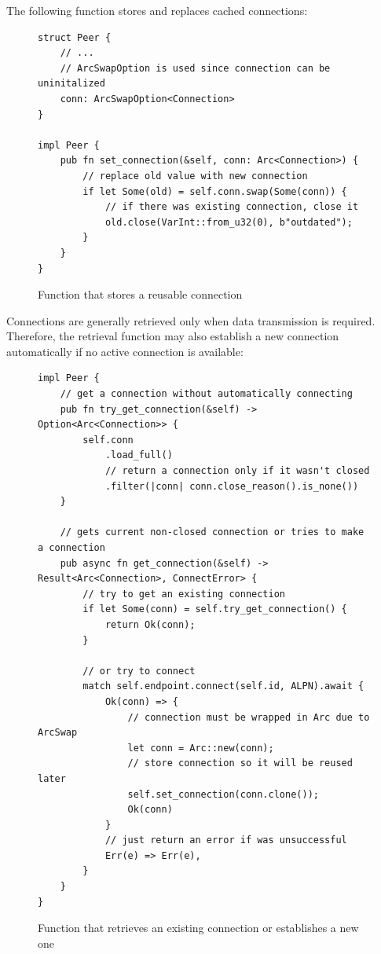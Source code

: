 \documentclass[a4paper, 10pt]{article}
\begin{document}
\newpage

The following function stores and replaces cached connections:
\begin{figure}[H]
  \begin{verbatim}
struct Peer {
    // ...
    // ArcSwapOption is used since connection can be uninitalized
    conn: ArcSwapOption<Connection>
}

impl Peer {
    pub fn set_connection(&self, conn: Arc<Connection>) {
        // replace old value with new connection
        if let Some(old) = self.conn.swap(Some(conn)) {
            // if there was existing connection, close it
            old.close(VarInt::from_u32(0), b"outdated");
        }
    }
}
  \end{verbatim}
  \caption{Function that stores a reusable connection}
\end{figure}

Connections are generally retrieved only when data transmission is required.
Therefore, the retrieval function may also establish a new connection automatically if no active connection is available:
\begin{figure}[H]
  \begin{verbatim}
impl Peer {
    // get a connection without automatically connecting
    pub fn try_get_connection(&self) -> Option<Arc<Connection>> {
        self.conn
            .load_full()
            // return a connection only if it wasn't closed
            .filter(|conn| conn.close_reason().is_none())
    }

    // gets current non-closed connection or tries to make a connection
    pub async fn get_connection(&self) -> Result<Arc<Connection>, ConnectError> {
        // try to get an existing connection
        if let Some(conn) = self.try_get_connection() {
            return Ok(conn);
        }

        // or try to connect
        match self.endpoint.connect(self.id, ALPN).await {
            Ok(conn) => {
                // connection must be wrapped in Arc due to ArcSwap
                let conn = Arc::new(conn);
                // store connection so it will be reused later
                self.set_connection(conn.clone());
                Ok(conn)
            }
            // just return an error if was unsuccessful
            Err(e) => Err(e),
        }
    }
}
  \end{verbatim}
  \caption{Function that retrieves an existing connection or establishes a new one}
\end{figure}
\end{document}
